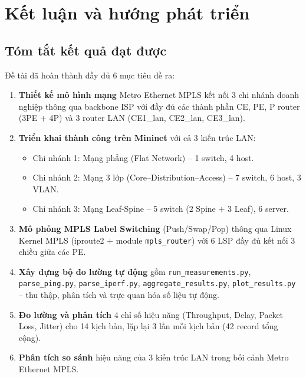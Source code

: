 \chapter{Kết luận và hướng phát triển}

\section{Tóm tắt kết quả đạt được}

Đề tài đã hoàn thành đầy đủ 6 mục tiêu đề ra:

\begin{enumerate}
    \item \textbf{Thiết kế mô hình mạng} Metro Ethernet MPLS kết nối 3 chi nhánh doanh nghiệp thông qua backbone ISP với đầy đủ các thành phần CE, PE, P router (3PE + 4P) và 3 router LAN (CE1\_lan, CE2\_lan, CE3\_lan).

    \item \textbf{Triển khai thành công trên Mininet} với cả 3 kiến trúc LAN:
    \begin{itemize}
        \item Chi nhánh 1: Mạng phẳng (Flat Network) -- 1 switch, 4 host.
        \item Chi nhánh 2: Mạng 3 lớp (Core--Distribution--Access) -- 7 switch, 6 host, 3 VLAN.
        \item Chi nhánh 3: Mạng Leaf-Spine -- 5 switch (2 Spine + 3 Leaf), 6 server.
    \end{itemize}

    \item \textbf{Mô phỏng MPLS Label Switching} (Push/Swap/Pop) thông qua Linux Kernel MPLS (iproute2 + module \texttt{mpls\_router}) với 6 LSP đầy đủ kết nối 3 chiều giữa các PE.

    \item \textbf{Xây dựng bộ đo lường tự động} gồm \texttt{run\_measurements.py}, \texttt{parse\_ping.py}, \texttt{parse\_iperf.py}, \texttt{aggregate\_results.py}, \texttt{plot\_results.py} -- thu thập, phân tích và trực quan hóa số liệu tự động.

    \item \textbf{Đo lường và phân tích} 4 chỉ số hiệu năng (Throughput, Delay, Packet Loss, Jitter) cho 14 kịch bản, lặp lại 3 lần mỗi kịch bản (42 record tổng cộng).

    \item \textbf{Phân tích so sánh} hiệu năng của 3 kiến trúc LAN trong bối cảnh Metro Ethernet MPLS.
\end{enumerate}

